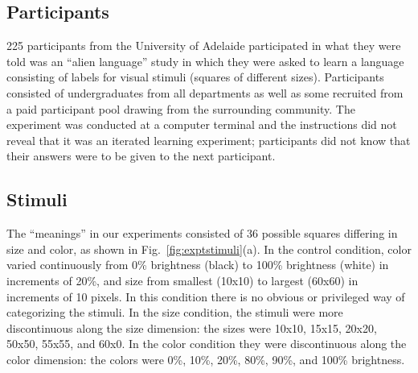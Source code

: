 \documentclass{apa}
\begin{document}
 \subsection{Participants}

225 participants from the University of Adelaide participated in what they were told was an ``alien language'' study in which they were asked to learn a language consisting of labels for visual stimuli (squares of different sizes). Participants consisted of undergraduates from all departments as well as some recruited from a paid participant pool drawing from the surrounding community. The experiment was conducted at a computer terminal and the instructions did not reveal that it was an iterated learning experiment; participants did not know that their answers were to be given to the next participant.

\subsection{Stimuli}

The ``meanings'' in our experiments consisted of 36 possible squares differing in size and color, as shown in Fig.~\ref{fig:exptstimuli}(a). In the {\sc control} condition, color varied continuously from 0\% brightness (black) to 100\% brightness (white) in increments of 20\%, and size from smallest (10x10) to largest (60x60) in increments of 10 pixels.  In this condition there is no obvious or privileged way of categorizing the stimuli. In the {\sc size} condition, the stimuli were more discontinuous along the size dimension: the sizes were 10x10, 15x15, 20x20, 50x50, 55x55, and 60x0. In the  {\sc color} condition they were discontinuous along the color dimension: the colors were 0\%, 10\%, 20\%, 80\%, 90\%, and 100\% brightness.
\end{document}
